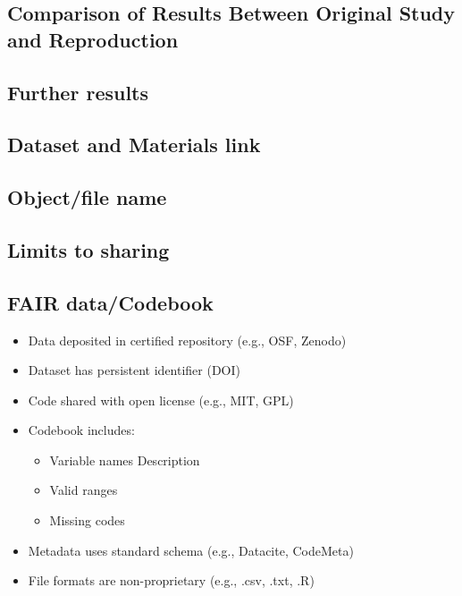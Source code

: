 \documentclass[
  letterpaper,
  DIV=11,
  numbers=noendperiod]{scrartcl}
\providecommand{\tightlist}{%
  \setlength{\itemsep}{0pt}\setlength{\parskip}{0pt}}
\begin{document}
\subsection{Comparison of Results Between Original Study and
Reproduction}\label{comparison-of-results-between-original-study-and-reproduction}

\subsection{Further results}\label{further-results}

\subsection{Dataset and Materials
link}\label{dataset-and-materials-link}

\subsection{Object/file name}\label{objectfile-name}

\subsection{Limits to sharing}\label{limits-to-sharing}

\subsection{FAIR data/Codebook}\label{fair-datacodebook}

\begin{itemize}
\item[$\square$]
  Data deposited in certified repository (e.g., OSF, Zenodo)
\item[$\square$]
  Dataset has persistent identifier (DOI)
\item[$\square$]
  Code shared with open license (e.g., MIT, GPL)
\item[$\square$]
  Codebook includes:

  \begin{itemize}
  \tightlist
  \item[$\square$]
    Variable names Description
  \item[$\square$]
    Valid ranges
  \item[$\square$]
    Missing codes
  \end{itemize}
\item[$\square$]
  Metadata uses standard schema (e.g., Datacite, CodeMeta)
\item[$\square$]
  File formats are non-proprietary (e.g., .csv, .txt, .R)
\end{itemize}
\end{document}
